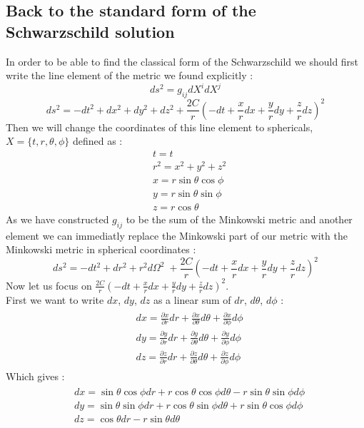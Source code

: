 \documentclass[a4paper,12pt]{article}
\theoremstyle{definition}
\begin{document}
\subsection{Back to the standard form of the Schwarzschild solution}
In order to be able to find the classical form of the Schwarzschild we should first write the line element of the metric we found explicitly :
\begin{equation}
	ds^2=g_{ij}dX^idX^j
\end{equation}
\begin{equation}
	ds^2=-dt^2+dx^2+dy^2+dz^2+\frac{2C}{r}(-dt+\frac{x}{r}dx+\frac{y}{r}dy+\frac{z}{r}dz)^2
\end{equation}
Then we will change the coordinates of this line element to sphericals, $X=\{t,r,\theta,\phi\}$ defined as :
\begin{align}
	&t=t\\
	&r^2=x^2+y^2+z^2\\
	&x=r\sin{\theta}\cos{\phi}\label{coord-transform-1}\\
	&y=r\sin{\theta}\sin{\phi}\\
	&z=r\cos{\theta}\label{coord-transform-3}
\end{align}
As we have constructed $g_{ij}$ to be the sum of the Minkowski metric and another element we can immediatly replace the Minkowski part of our metric with the Minkowski metric in spherical coordinates :
\begin{equation} \label{line-elem-schwarz}
	ds^2=-dt^2+dr^2+r^2d\Omega^2\;+\frac{2C}{r}(-dt+\frac{x}{r}dx+\frac{y}{r}dy+\frac{z}{r}dz)^2
\end{equation} 
Now let us focus on $\frac{2C}{r}(-dt+\frac{x}{r}dx+\frac{y}{r}dy+\frac{z}{r}dz)^2$.\\
First we want to write $dx$, $dy$, $dz$ as a linear sum of $dr$, $d\theta$, $d\phi$ :
\begin{align}
\begin{split}
	&dx=\frac{\partial x}{\partial r}dr+\frac{\partial x}{\partial \theta}d\theta+\frac{\partial x}{\partial \phi}d\phi\\
	&dy=\frac{\partial y}{\partial r}dr+\frac{\partial y}{\partial \theta}d\theta+\frac{\partial y}{\partial \phi}d\phi\\
	&dz=\frac{\partial z}{\partial r}dr+\frac{\partial z}{\partial \theta}d\theta+\frac{\partial z}{\partial \phi}d\phi
\end{split}
\end{align}
Which gives :
\begin{align}
\begin{split}
	&dx=\sin{\theta}\cos{\phi}dr+r\cos{\theta}\cos{\phi}d\theta-r\sin{\theta}\sin{\phi}d\phi \\
	&dy=\sin{\theta}\sin{\phi}dr+r\cos{\theta}\sin{\phi}d\theta+r\sin{\theta}\cos{\phi}d\phi \\
	&dz=\cos{\theta}dr-r\sin{\theta}d\theta
\end{split}
\end{align}
\end{document}
